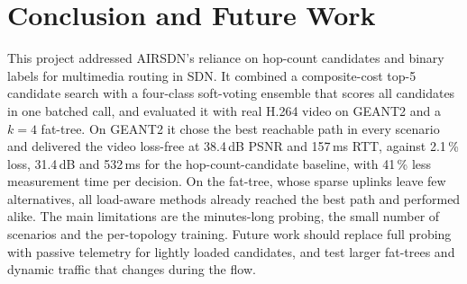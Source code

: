\documentclass[conference,a4paper]{IEEEtran}
\begin{document}
\FloatBarrier
\section{Conclusion and Future Work}
This project addressed AIRSDN's reliance on hop-count candidates and binary labels for multimedia routing in SDN.
It combined a composite-cost top-5 candidate search with a four-class soft-voting ensemble that scores all
candidates in one batched call, and evaluated it with real H.264 video on GEANT2 and a $k=4$ fat-tree. On GEANT2
it chose the best reachable path in every scenario and delivered the video loss-free at 38.4\,dB PSNR and 157\,ms
RTT, against 2.1\,\% loss, 31.4\,dB and 532\,ms for the hop-count-candidate baseline, with 41\,\% less measurement
time per decision. On the fat-tree, whose sparse uplinks leave few alternatives, all load-aware methods already
reached the best path and performed alike. The main limitations are the minutes-long probing, the small number of
scenarios and the per-topology training. Future work should replace full probing with passive telemetry for
lightly loaded candidates, and test larger fat-trees and dynamic traffic that changes during the flow.
\end{document}
